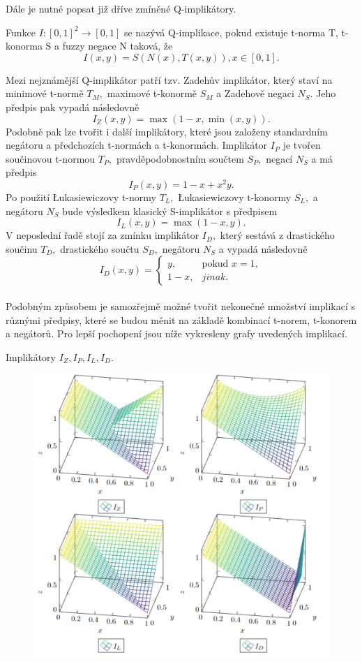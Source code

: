 Dále je nutné popsat již dříve zmíněné Q-implikátory.
\begin{definition}
    \cite{Springer}
    Funkce $I: [0,1]^2 \rightarrow [0,1]$ se nazývá Q-implikace, pokud existuje t-norma T, t-konorma S a fuzzy negace N taková, že $$I(x,y) = S(N(x),T(x,y)), x \in [0,1].$$
\end{definition}
Mezi nejznámější Q-implikátor patří tzv. Zadeh\r uv implikátor, který staví na minimové t-normě $T_M,$ maximové t-konormě $S_M$ a Zadehově negaci $N_S$. Jeho předpis pak vypadá následovně $$I_Z(x,y) = \max(1-x, \min(x,y)).$$ Podobně pak lze tvořit i další implikátory, které jsou založeny standardním negátoru a předchozích t-normách a t-konormách. Implikátor $I_P$ je tvořen součinovou t-normou $T_P,$ pravděpodobnostním součtem $S_P,$ negací $N_S$ a má předpis $$I_P(x,y) = 1-x+x^2y.$$  Po použití Łukasiewiczovy t-normy $T_L,$ Łukasiewiczovy t-konormy $S_L,$ a negátoru $N_S$ bude výsledkem klasický S-implikátor s předpisem $$I_L(x,y) = \max(1-x, y).$$ V neposlední řadě stojí za zmínku implikátor $I_D,$ který sestává z drastického součinu $T_D,$ drastického součtu $S_D,$ negátoru $N_S$ a vypadá následovně $$I_D(x,y) = \begin{cases}  y, & \mbox{pokud } x = 1,\\
                1 - x, &  jinak.  \end{cases}$$\\ 
Podobným zp\r usobem je samozřejmě možné tvořit nekonečné množství implikací s r\r uznými předpisy, které se budou měnit na základě kombinací t-norem, t-konorem a negátor\r u. Pro lepší pochopení jsou níže vykresleny grafy uvedených implikací.
\begin{graph}Implikátory $I_Z, I_P, I_L, I_D.$
\begin{figure}[H]
                \hspace{-1cm}
                \includegraphics[scale=0.5]{template-fig/impl3.pdf}
                \centering
            \end{figure}
    
\end{graph}

